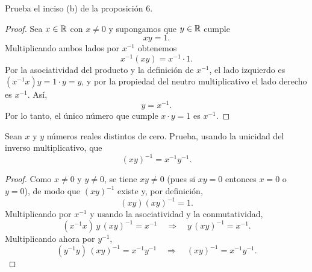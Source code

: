 \documentclass[12pt,a4paper]{article}
\begin{document}
        
    \thispagestyle{empty}
    

    \begin{problema}
        Prueba el inciso (b) de la proposición 6.
    \end{problema}

    \begin{proof}
        Sea $x\in\mathbb{R}$ con $x\neq0$ y supongamos que $y\in\mathbb{R}$ cumple
        \begin{equation*}
            xy=1.
        \end{equation*}
        Multiplicando ambos lados por $x^{-1}$ obtenemos
        \begin{equation*}
            x^{-1}(xy)=x^{-1}\cdot1.
        \end{equation*}
        Por la asociatividad del producto y la definición de $x^{-1}$, el lado izquierdo es $(x^{-1}x)y=1\cdot y=y$, y por la propiedad del neutro multiplicativo el lado derecho es $x^{-1}$. Así,
        \begin{equation*}
            y=x^{-1}.
        \end{equation*}
        Por lo tanto, el único número que cumple $x\cdot y=1$ es $x^{-1}$.
    \end{proof}

    \begin{problema}
        Sean $x$ y $y$ números reales distintos de cero. Prueba, usando la unicidad del inverso multiplicativo, que
        \begin{equation*}
            (xy)^{-1}=x^{-1}y^{-1}.
        \end{equation*}
    \end{problema}

    \begin{proof}
        Como $x\neq0$ y $y\neq0$, se tiene $xy\neq0$ (pues si $xy=0$ entonces $x=0$ o $y=0$), de modo que $(xy)^{-1}$ existe y, por definición,
        \begin{equation*}
            (xy)(xy)^{-1}=1.
        \end{equation*}
        Multiplicando por $x^{-1}$ y usando la asociatividad y la conmutatividad,
        \begin{equation*}
            (x^{-1}x)\,y\,(xy)^{-1}=x^{-1}
            \quad\Longrightarrow\quad
            y\,(xy)^{-1}=x^{-1}.
        \end{equation*}
        Multiplicando ahora por $y^{-1}$,
        \begin{equation*}
            (y^{-1}y)\,(xy)^{-1}=x^{-1}y^{-1}
            \quad\Longrightarrow\quad
            (xy)^{-1}=x^{-1}y^{-1}.
        \end{equation*}
    \end{proof}
\end{document}

